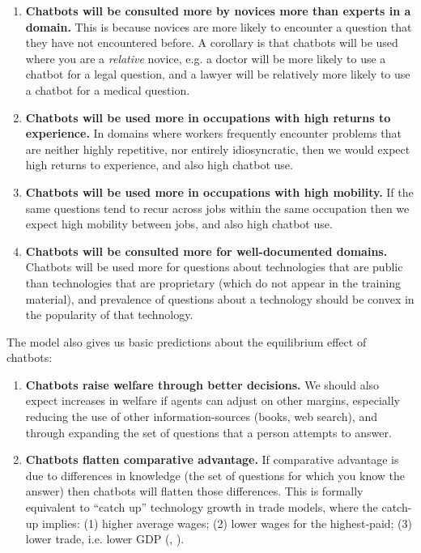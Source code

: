 \documentclass[\ifdraft draft\fi]{article}
\begin{document}
   \begin{enumerate}
      \item \textbf{Chatbots will be consulted more by novices more than experts in a domain.} This is because novices are more likely to encounter a question that they have not encountered before. A corollary is that chatbots will be used where you are a \textit{relative} novice, e.g. a doctor will be more likely to use a chatbot for a legal question, and a lawyer will be relatively more likely to use a chatbot for a medical question. 
      \item \textbf{Chatbots will be used more in occupations with high returns to experience.} In domains where workers frequently encounter problems that are neither highly repetitive, nor entirely idiosyncratic, then we would expect high returns to experience, and also high chatbot use.
      \item \textbf{Chatbots will be used more in occupations with high mobility.} If the same questions tend to recur across jobs within the same occupation then we expect high mobility between jobs, and also high chatbot use.
      \item \textbf{Chatbots will be consulted more for well-documented domains.} Chatbots will be used more for questions about technologies that are public than technologies that are proprietary (which do not appear in the training material), and prevalence of questions about a technology should be convex in the popularity of that technology.
   \end{enumerate}

The model also gives us basic predictions about the equilibrium effect of chatbots:

   \begin{enumerate}
      \item \textbf{Chatbots raise welfare through better decisions.} We should also expect increases in welfare if agents can adjust on other margins, especially reducing the use of other information-sources (books, web search), and through expanding the set of questions that a person attempts to answer.
      \item \textbf{Chatbots flatten comparative advantage.} If comparative advantage is due to differences in knowledge (the set of questions for which you know the answer) then chatbots will flatten those differences. This is formally equivalent to ``catch up'' technology growth in trade models, where the catch-up implies: (1) higher average wages; (2) lower wages for the highest-paid; (3) lower trade, i.e. lower GDP (\citet{dornbusch1977comparative}, \citet{wilson1980general}). 
   \end{enumerate}
\end{document}
